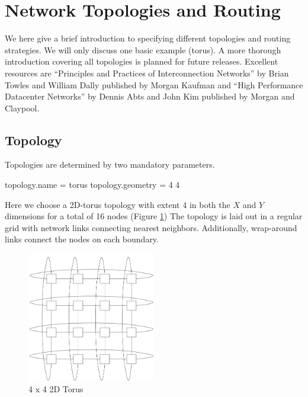 
\section{Network Topologies and Routing}
\label{sec:tutorial:topology}
We here give a brief introduction to specifying different topologies and routing strategies.
We will only discuss one basic example (torus).
A more thorough introduction covering all topologies is planned for future releases.
Excellent resources are ``Principles and Practices of Interconnection Networks'' by Brian Towles and William Dally published by Morgan Kaufman and ``High Performance Datacenter Networks'' by Dennis Abts and John Kim published by Morgan and Claypool.

\subsection{Topology}
\label{subsec:tutorial:topology}

Topologies are determined by two mandatory parameters.

\begin{ViFile}
topology.name = torus
topology.geometry = 4 4
\end{ViFile}
Here we choose a 2D-torus topology with extent 4 in both the $X$ and $Y$ dimensions for a total of 16 nodes (Figure \ref{fig:torus:basic})
The topology is laid out in a regular grid with network links connecting nearest neighbors.
Additionally, wrap-around links connect the nodes on each boundary.
\begin{figure}[h]
\centering
\includegraphics[width=0.5\textwidth]{figures/tikz/torus/torus.png}
\caption{4 x 4 2D Torus}
\label{fig:torus:basic}
\end{figure}


